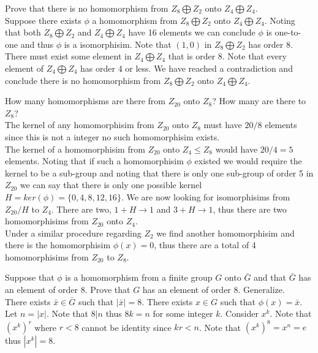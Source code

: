 \documentclass[12pt]{article}
\makeatletter
\theoremstyle{homework}
\newenvironment{exercise}[1]
{\def\@currentlabel{#1}\exercisecore}
{\endexercisecore}
\makeatother
\begin{document}
\begin{exercise}{10.16}
Prove that there is no homomorphism from $Z_8\bigoplus  Z_2$ onto $Z_4 \bigoplus Z_4$.\\
Suppose there exists $\phi$ a homomorphism from $Z_8\bigoplus  Z_2$ onto $Z_4 \bigoplus Z_4$.  Noting that both $Z_8\bigoplus  Z_2$ and $Z_4 \bigoplus Z_4$ have 16 elements we can conclude $\phi$ is one-to-one and thus $\phi$ is a isomorphisim.  Note that $(1,0)$ in $Z_8\bigoplus  Z_2$ has order 8.  There must exist some element in $Z_4 \bigoplus Z_4$ that is order 8.  Note that every element of $Z_4 \bigoplus Z_4$ has order 4 or less.  We have reached a contradiction and conclude there is no homomorphism from $Z_8\bigoplus  Z_2$ onto $Z_4 \bigoplus Z_4$.
\end{exercise}

\begin{exercise}{10.20}
How many homomorphisms are there from $Z_{20}$ onto $Z_8$? How many are there to $Z_8$?\\
The kernel of any homomorphisim from $Z_{20}$ onto $Z_8$ must have $20/8$ elements since this is not a integer no such homomorphisim exists.\\
The kernel of a homomorphisim from $Z_{20}$ onto $Z_{4}\leq Z_8$ would have $20/4=5$ elements.  Noting that if such a homomorphisim $\phi$ existed we would require the kernel to be a sub-group and noting that there is only one sub-group of order 5 in $Z_{20}$ we can say that there is only one possible kernel $H=ker(\phi)=\{0,4,8,12,16\}$.  We are now looking for isomorphisims from $Z_{20}/H$ to $Z_{4}$.  There are two, $1+H\rightarrow 1$ and $3+H\rightarrow 1$, thus there are two homomorphisims from $Z_{20}$ onto $Z_{4}$.\\
Under a similar procedure regarding $Z_2$ we find another homomorphisim and there is the homomorphisim $\phi(x)=0$, thus there are a total of 4 homomorphisims from $Z_{20}$ to $Z_8$.
\end{exercise}

\begin{exercise}{10.22}
Suppose that $\phi$ is a homomorphism from a finite group $G$ onto $\bar{G}$ and that $\bar{G}$ has an element of order 8. Prove that $G$ has an element of order 8. Generalize.\\
There exists $\bar{x}\in \bar{G}$ such that $|\bar{x}|=8$.  There exists $x\in G$ such that $\phi(x)=\bar{x}$.  Let $n=|x|$.  Note that $8|n$ thus $8k=n$ for some integer $k$.  Consider $x^k$.  Note that $(x^k)^r$ where $r<8$ cannot be identity since $kr<n$.  Note that $(x^k)^8=x^n=e$ thus $|x^k|=8$.
\end{exercise}
\end{document}
